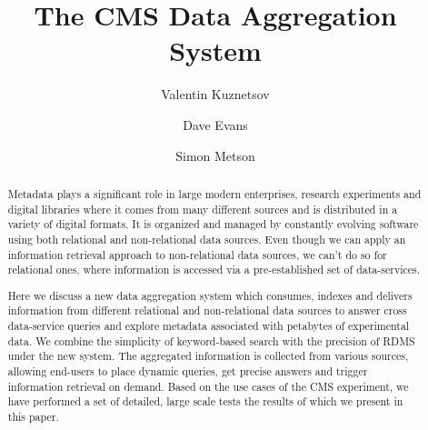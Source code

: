 \documentclass[1p,times]{elsarticle}
\begin{document}
\begin{frontmatter}



\dochead{}

\title{The CMS Data Aggregation System}


\author[vkuznet]{Valentin Kuznetsov}
\address[vkuznet]{Cornell University, Ithaca, New York, USA}

\author[evans]{Dave Evans}
\address[evans]{Fermilab, Batavia, Illinois, USA}

\author[metson]{Simon Metson}
\address[metson]{Bristol University, Bristol, UK}


\begin{abstract}
Metadata plays a significant role in large modern enterprises, 
research experiments and digital libraries where it comes from many different 
sources and is distributed in a variety of digital formats. 
It is organized and managed by constantly evolving software using 
both relational and non-relational data sources. Even though we can apply
an information retrieval approach to non-relational data sources,
we can't do so for relational ones, where information is accessed via
a pre-established set of data-services.

Here we discuss a new data aggregation system which consumes, 
indexes and delivers information from different relational and 
non-relational data sources to answer cross data-service queries 
and explore metadata associated with petabytes of experimental data. 
We combine the simplicity of keyword-based search with the precision of RDMS
under the new system. The aggregated information is collected from various sources,
allowing end-users to place dynamic queries, get precise answers and 
trigger information retrieval on demand. Based on the use cases of the CMS experiment, 
we have performed a set of detailed, large scale tests the results of which 
we present in this paper.
\end{abstract}


\end{frontmatter}
\end{document}
